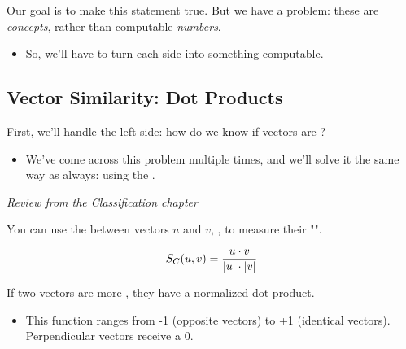         Our goal is to make this statement true. But we have a problem: these are \textit{concepts}, rather than computable \textit{numbers}. 

        \begin{itemize}
            \item So, we'll have to turn each side into something computable.
        \end{itemize}



    \phantom{}

    \subsection{Vector Similarity: Dot Products}

        First, we'll handle the left side: how do we know if vectors are ? 
        
        \begin{itemize}
            \item We've come across this problem multiple times, and we'll solve it the same way as always: using the .\\
        \end{itemize}

        \begin{concept}
            \textit{Review from the Classification chapter}
            
            You can use the  between vectors $u$ and $v$, , to measure their "". 

            \begin{equation*}
                S_C(u,v) = \frac{u \cdot v}{\abs{u} \cdot \abs{v}}
            \end{equation*}
            
            If two vectors are more , they have a  normalized dot product. 

            \begin{itemize}
                \item This function ranges from -1 (opposite vectors) to +1 (identical vectors). Perpendicular vectors receive a 0.
            \end{itemize}
        \end{concept}


